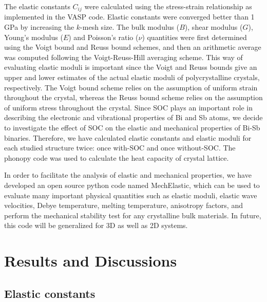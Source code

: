\documentclass[twocolumn,superscriptaddress,nofootinbib,floatfix,aps,showpacs,prb,citeautoscript,reprint]{revtex4-1}
\begin{document}
The elastic constants $C_{ij}$ were calculated using the stress-strain relationship as implemented in the {\sc VASP} code. Elastic constants were converged better than 1 GPa by increasing the $k$-mesh size. The bulk modulus ($B$), shear modulus ($G$), Young's modulus ($E$) and Poisson's ratio ($\nu$) quantities were first determined using the Voigt bound\cite{voigt1928} and Reuss bound\cite{reuss1929} schemes, and then an arithmetic average was computed following the Voigt-Reuss-Hill averaging scheme. \cite{Hill1952} This way of evaluating elastic moduli is important since the Voigt and Reuss bounds give an upper and lower estimates of the actual elastic moduli of polycrystalline crystals, respectively. The Voigt bound scheme\cite{voigt1928} relies on the assumption of uniform strain throughout the crystal, whereas the Reuss bound scheme\cite{reuss1929} relies on the assumption of uniform stress throughout the crystal. Since SOC plays an important role in describing the electronic and vibrational properties of Bi and Sb atoms,\cite{BiSOC_PRB2007, SbSOC_PRB2008, BiSOC_PRL2007} we decide to investigate the effect of SOC on the elastic and mechanical properties of Bi-Sb binaries.  Therefore, we have calculated elastic constants and elastic moduli for each studied structure twice: once with-SOC and once without-SOC. The phonopy code\cite{Togo2008, phonopy} was used to calculate the heat capacity of crystal lattice. 

In order to facilitate the analysis of elastic and mechanical properties, we have developed an open source python code named MechElastic\cite{MechElastic}, which can be used to evaluate many important physical quantities such as elastic moduli, elastic wave velocities, Debye temperature, melting temperature, anisotropy factors, and perform the mechanical stability test for any crystalline bulk materials. In future, this code will be generalized for 3D as well as 2D systems.



\section{Results and Discussions}

 \subsection{Elastic constants}
\end{document}
